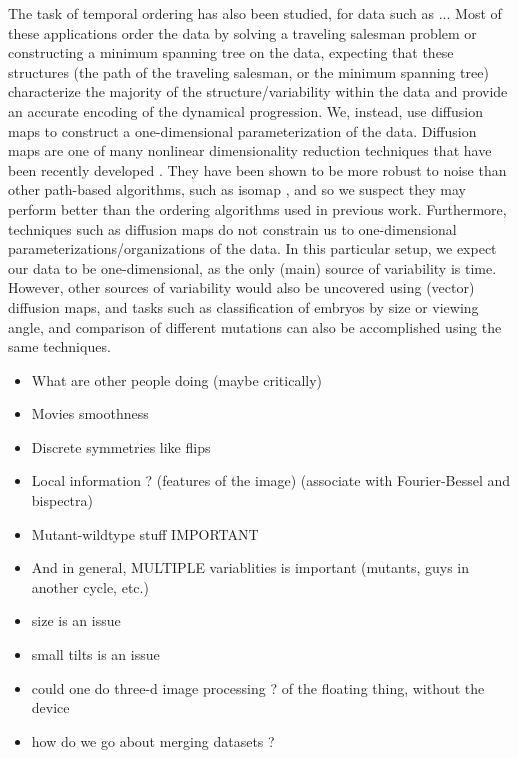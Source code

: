 \documentclass{pnastwo}
\begin{document}
\begin{article}
The task of temporal ordering has also been studied, for data such as ...
%
Most of these applications order the data by solving a traveling salesman problem or constructing a minimum spanning tree on the data,
expecting that these structures (the path of the traveling salesman, or the minimum spanning tree) characterize the majority of the structure/variability within the data and provide an accurate encoding of the dynamical progression.
%
We, instead, use diffusion maps to construct a one-dimensional parameterization of the data.
%
Diffusion maps are one of many nonlinear dimensionality reduction techniques that have been recently developed \cite{Belkin2003, tenenbaum2000global, Donoho2003, Roweis2000}.
%
They have been shown to be more robust to noise than other path-based algorithms, such as isomap \cite{balasubramanian2002isomap}, and so we suspect they may perform better than the ordering algorithms used in previous work.
% 
Furthermore, techniques such as diffusion maps do not constrain us to one-dimensional parameterizations/organizations of the data.
% 
In this particular setup, we expect our data to be one-dimensional, as the only (main) source of variability is time.
%
However, other sources of variability would also be uncovered using (vector) diffusion maps, 
and tasks such as classification of embryos by size or viewing angle, and comparison of different mutations can also be accomplished using the same techniques. 


\begin{itemize}
\item What are other people doing  (maybe critically)
\item Movies  smoothness
\item Discrete symmetries like flips
\item Local information ? (features of the image) (associate with Fourier-Bessel and bispectra)
\item Mutant-wildtype stuff  IMPORTANT
\item And in general, MULTIPLE variablities is important (mutants, guys in another cycle, etc.)
 
\item size is an issue
\item  small tilts is an issue
\item   could one do three-d image processing ?  of the floating thing, without the device
\item how do we go about merging datasets ?
\end{itemize}






\end{article}
\end{document}
